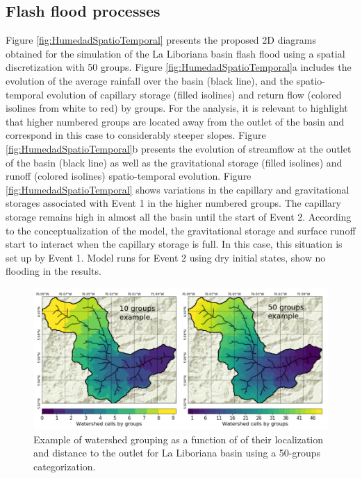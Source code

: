 \documentclass[hess, manuscript]{copernicus}
\begin{document}
\subsection{Flash flood processes}


Figure \ref{fig:HumedadSpatioTemporal} presents the proposed 2D diagrams obtained for the simulation of the La Liboriana basin flash flood using a spatial discretization with 50 groups. Figure \ref{fig:HumedadSpatioTemporal}a includes the evolution of the average rainfall over the basin (black line), and the spatio-temporal evolution of capillary storage (filled isolines) and return flow (colored isolines from white to red) by groups. For the analysis, it is relevant to highlight that higher numbered groups are located away from the outlet of the basin and correspond in this case to considerably steeper slopes. Figure \ref{fig:HumedadSpatioTemporal}b presents the evolution of streamflow at the outlet of the basin (black line) as well as the gravitational storage (filled isolines) and runoff (colored isolines) spatio-temporal evolution.  Figure \ref{fig:HumedadSpatioTemporal} shows  variations in the capillary and gravitational storages associated with Event 1 in the higher numbered groups.  The capillary storage remains high in almost all the basin until the start of Event 2.  According to the conceptualization of the model, the gravitational storage and surface runoff start to interact when the capillary storage is full. In this case, this situation is set up by Event 1.  Model runs for Event 2 using dry initial states, show no flooding in the results.\\

\begin{figure}[t!]
\centering
 \includegraphics[width=14cm]{Figures/Mapas_Grupos.png}
 \caption{Example of watershed grouping as a function of of their localization and distance to the outlet for La Liboriana basin using a 50-groups categorization.}
    \label{fig:groupsexample}
\end{figure}
\end{document}
